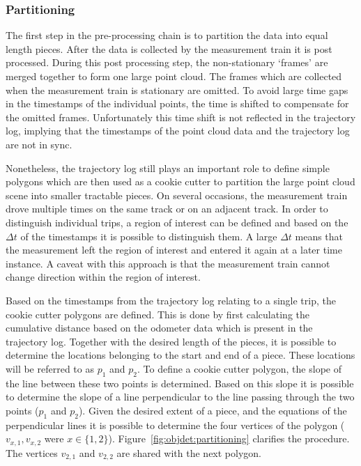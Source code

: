 \subsubsection{Partitioning}\label{sec:objdet:partitioning}
The first step in the pre-processing chain is to partition the data into equal length pieces. After the data is collected by the measurement train it is post processed. During this post processing step, the non-stationary `frames' are merged together to form one large point cloud. The frames which are collected when the measurement train is stationary are omitted. To avoid large time gaps in the timestamps of the individual points, the time is shifted to compensate for the omitted frames. Unfortunately this time shift is not reflected in the trajectory log, implying that the timestamps of the point cloud data and the trajectory log are not in sync.

Nonetheless, the trajectory log still plays an important role to define simple polygons which are then used as a cookie cutter to partition the large point cloud scene into smaller tractable pieces. On several occasions, the measurement train drove multiple times on the same track or on an adjacent track. In order to distinguish individual trips, a region of interest can be defined and based on the \(\Delta t\) of the timestamps it is possible to distinguish them. A large \(\Delta t\) means that the measurement left the region of interest and entered it again at a later time instance. A caveat with this approach is that the measurement train cannot change direction within the region of interest.

Based on the timestamps from the trajectory log relating to a single trip, the cookie cutter polygons are defined. This is done by first calculating the cumulative distance based on the odometer data which is present in the trajectory log. Together with the desired length of the pieces, it is possible to determine the locations belonging to the start and end of a piece. These locations will be referred to as \(p_1\) and \(p_2\). To define a cookie cutter polygon, the slope of the line between these two points is determined. Based on this slope it is possible to determine the slope of a line perpendicular to the line passing through the two points (\(p_1\) and \(p_2\)). Given the desired extent of a piece, and the equations of the perpendicular lines it is possible to determine the four vertices of the polygon (\(v_{x,1}, v_{x,2}\) were \(x \in \{1,2\}\)). Figure~\ref{fig:objdet:partitioning} clarifies the procedure. The vertices \(v_{2,1}\) and \(v_{2,2}\) are shared with the next polygon.

